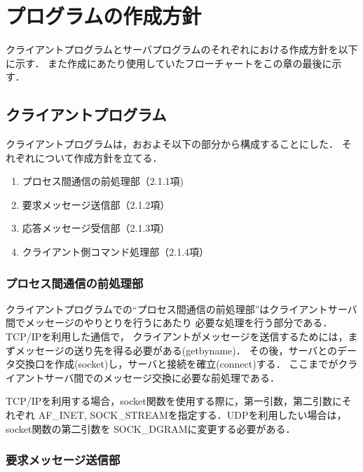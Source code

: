 \documentclass[a4paper,11pt]{jarticle}
\begin{document}
\section{プログラムの作成方針}

クライアントプログラムとサーバプログラムのそれぞれにおける作成方針を以下に示す．
また作成にあたり使用していたフローチャートをこの章の最後に示す．

\subsection{クライアントプログラム}
クライアントプログラムは，おおよそ以下の部分から構成することにした．
それぞれについて作成方針を立てる．
\begin{enumerate}
\setlength{\parskip}{2pt} \setlength{\itemsep}{2pt}
    \item プロセス間通信の前処理部（2.1.1項)
    \item 要求メッセージ送信部（2.1.2項）
    \item 応答メッセージ受信部（2.1.3項）
    \item クライアント側コマンド処理部（2.1.4項）
\end{enumerate}


\subsubsection{プロセス間通信の前処理部} \label{sec:pre}

クライアントプログラムでの``プロセス間通信の前処理部''はクライアントサーバ間でメッセージのやりとりを行うにあたり
必要な処理を行う部分である．
TCP/IPを利用した通信で，
クライアントがメッセージを送信するためには，まずメッセージの送り先を得る必要がある(getbyname)．
その後，サーバとのデータ交換口を作成(socket)し，サーバと接続を確立(connect)する．
ここまでがクライアントサーバ間でのメッセージ交換に必要な前処理である．

TCP/IPを利用する場合，socket関数を使用する際に，第一引数，第二引数にそれぞれ
AF\_INET, SOCK\_STREAMを指定する．UDPを利用したい場合は，socket関数の第二引数を
SOCK\_DGRAMに変更する必要がある．


\subsubsection{要求メッセージ送信部} \label{sec:send}
\end{document}
